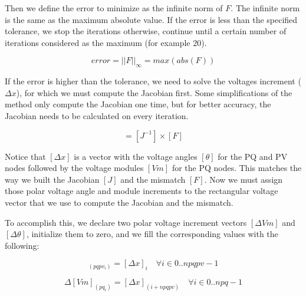 \documentclass[nols,a4paper,twoside,symmetric,notoc,fleqn]{tufte-book}
\begin{document}
Then we define the error to minimize as the infinite norm of $F$. The infinite norm is the same as the maximum absolute value. If the error is less than the specified tolerance, we stop the iterations otherwise, continue until a certain number of iterations considered as the maximum (for example 20).

\begin{equation}
error = ||F||_{\infty} = max(abs(F))
\label{eq:nr_error}
\end{equation}

If the error is higher than the tolerance, we need to solve the voltages increment ($\Delta x$), for which we must compute the Jacobian first. Some simplifications of the method only compute the Jacobian one time, but for better accuracy, the Jacobian needs to be calculated on every iteration.


\begin{equation}
[\Delta x] = [J^{-1}] \times [F]
\label{eq:nr_solve}
\end{equation}

Notice that $[\Delta x]$ is a vector with the voltage angles $[\theta]$ for the PQ and PV nodes followed by the voltage modules $[Vm]$ for the PQ nodes. This matches the way we built the Jacobian $[J]$ and the mismatch $[F]$. Now we must assign those polar voltage angle and module increments to the rectangular voltage vector that we use to compute the Jacobian and the mismatch.

To accomplish this, we declare two polar voltage increment vectors $[\Delta Vm]$ and $[\Delta \theta]$, initialize them to zero, and we fill the corresponding values with the following:


\begin{equation}
[\Delta \theta]_{(pqpv_i)} = [\Delta x]_i  \quad \forall i \in {0..npqpv-1}
\label{eq:nr_dd1}
\end{equation}

\begin{equation}
\Delta  [Vm]_{(pq_i)} = [\Delta x]_{(i+npqpv)}  \quad \forall i \in {0..npq-1}
\end{equation}
\end{document}
